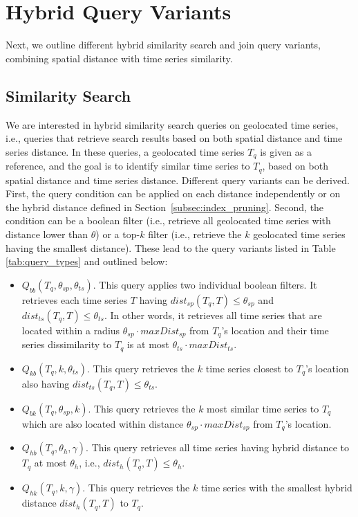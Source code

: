 
\graphicspath{{Papers/SIGSpatial2017/}{Papers/SIGSpatial2018/}}

\section{Hybrid Query Variants}
\label{sec:query_types}

Next, we outline different hybrid similarity search and join query variants, combining spatial distance with time series similarity.

\subsection{Similarity Search}
\label{subsec:sim_serach_prob}
We are interested in hybrid similarity search queries on geolocated time series, i.e., queries that retrieve search results based on both spatial distance and time series distance. In these queries, a geolocated time series $T_q$ is given as a reference, and the goal is to identify similar time series to $T_q$, based on both spatial distance and time series distance. Different query variants can be derived. First, the query condition can be applied on each distance independently or on the hybrid distance defined in Section~\ref{subsec:index_pruning}. Second, the condition can be a boolean filter (i.e., retrieve all geolocated time series with distance lower than $\theta$) or a top-$k$ filter (i.e., retrieve the $k$ geolocated time series having the smallest distance). These lead to the query variants listed in Table \ref{tab:query_types} and outlined below:

\begin{itemize}
 \item $Q_{bb}(T_q, \theta_{sp}, \theta_{ts})$. This query applies two individual boolean filters. It retrieves each time series $T$ having $dist_{sp}(T_q, T) \leq \theta_{sp}$ and $dist_{ts}(T_q, T) \leq \theta_{ts}$. In other words, it retrieves all time series that are located within a radius $\theta_{sp} \cdot maxDist_{sp}$ from $T_q$'s location and their time series dissimilarity to $T_q$ is at most $\theta_{ts} \cdot maxDist_{ts}$.
 \item $Q_{kb}(T_q, k, \theta_{ts})$. This query retrieves the $k$ time series closest to $T_q$'s location also having $dist_{ts}(T_q, T) \leq \theta_{ts}$.
 \item $Q_{bk}(T_q, \theta_{sp}, k)$. This query retrieves the $k$ most similar time series to $T_q$ which are also located within distance $\theta_{sp} \cdot maxDist_{sp}$ from $T_q$'s location.
 \item $Q_{hb}(T_q, \theta_h, \gamma)$. This query retrieves all time series having hybrid distance to $T_q$ at most $\theta_h$, i.e., $dist_h(T_q, T) \leq \theta_h$.
 \item $Q_{hk}(T_q, k, \gamma)$. This query retrieves the $k$ time series with the smallest hybrid distance $dist_h(T_q, T)$ to $T_q$.
\end{itemize}

